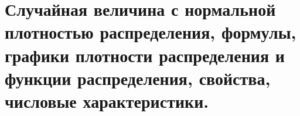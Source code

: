 \documentclass[polytech/stats/exam-2023/stats-exam-2023.tex]{subfiles}
\begin{document}
\section{Случайная величина с нормальной плотностью распределения, формулы, графики плотности распределения и функции распределения, свойства, числовые характеристики.}
\end{document}
